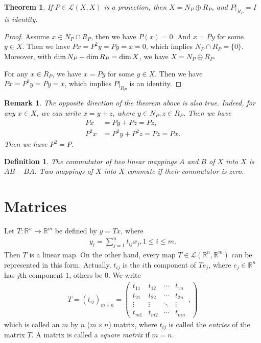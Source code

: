 \documentclass[11pt]{book}
\newtheorem{definition}{Definition}[chapter]
\newtheorem{theorem}{Theorem}[chapter]
\newtheorem{remark}{Remark}[chapter]
\theoremstyle{definition}
\numberwithin{equation}{chapter}
\begin{document}
\begin{theorem}\label{projection_direct_sum}
If $P\in\mathscr{L}(X,X)$ is a projection, then $X = N_P\oplus R_P$, and $P|_{R_P} = I$ is identity.
\end{theorem}
\begin{proof}
Assume $x\in N_P\cap R_P$, then we have $P(x) = 0$. And $x = P y$ for some $y\in X$. Then we have $Px = P^2 y = P y = x = 0$, which implies $N_P\cap R_P = \{0\}$. Moreover, with ${\rm dim}\, N_P + {\rm dim}\, R_P = {\rm dim}\, X$, we have $X = N_P\oplus R_P$.

For any $x\in R_P$, we have $x = P y$ for some $y\in X$. Then we have $Px = P^2 y = Py = x$, which implies $P|_{R_P}$ is an identity.
\end{proof}
\begin{remark}
The opposite direction of the theorem above is also true. Indeed, for any $x\in X$, we can write $x = y+z$, where $y\in N_P, z\in R_P$. Then we have
\begin{align*}
    Px & = Py + Pz = Pz, \\
    P^2 x & = P^2 y + P^2 z = Pz = Px.
\end{align*}
Then we have $P^2=P$.
\end{remark}

\medskip

\begin{definition}
The commutator of two linear mappings $A$ and $B$ of $X$ into $X$ is $AB - BA$. Two mappings of $X$ into $X$ commute if their commutator is zero.
\end{definition}


\medskip

\chapter{Matrices}
Let $T:\mathbb{R}^n\to\mathbb{R}^m$ be defined by $y = T x$, where
\begin{align*}
    y_i = \sum^n_{j=1} t_{ij}x_j, 1\leq i\leq m.
\end{align*}
Then $T$ is a linear map. On the other hand, every map $T\in \mathscr{L}(\mathbb{R}^n,\mathbb{R}^m)$ can be represented in this form. Actually, $t_{ij}$ is the $i$th component of $Te_j$, where $e_j\in \mathbb{R}^n$ has $j$th component $1$, others be $0$. We write
\begin{align*}
    T = (t_{ij})_{m\times n} = \left(
        \begin{matrix}
        t_{11} & t_{12} & \cdots & t_{1n}\\
        t_{21} & t_{22} & \cdots & t_{2n}\\
        \vdots & \vdots & \ddots & \vdots\\
        t_{m1} & t_{m2} & \cdots & t_{mn}
        \end{matrix},
    \right)
\end{align*}
which is called an $m$ by $n$ ($m\times n$) matrix, where $t_{ij}$ is called the \emph{entries} of the matrix $T$. A matrix is called a \emph{square matrix} if $m=n$. 
\end{document}
